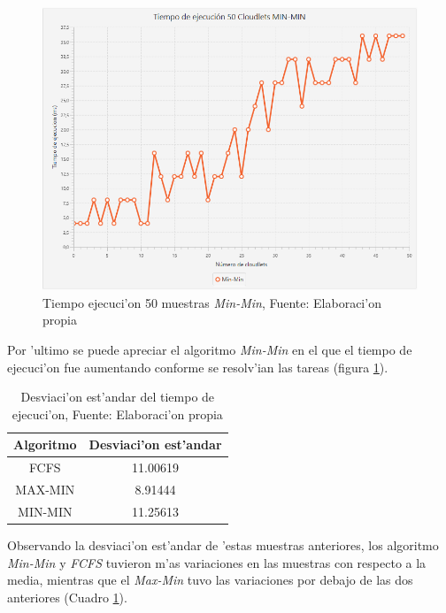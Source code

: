 \newpage
\renewcommand\thefigure{\arabic{figure}}
\begin{figure}[h!] 
	\centering
	\includegraphics[scale=0.5]{media/min-min}
	\caption{Tiempo ejecuci'on 50 muestras \textit{Min-Min}, Fuente: Elaboraci'on propia}
	\label{fig:minmin}
\end{figure}


Por 'ultimo se puede apreciar el algoritmo \textit{Min-Min} en el que el tiempo de ejecuci'on fue aumentando conforme se resolv'ian las tareas (figura \ref{fig:minmin}).


\setcounter{table}{4}
\renewcommand\thetable{\arabic{table}}
\begin{table}[h!]
	\centering
	\begin{tabular}{@{}cc@{}}
		\toprule
		{\bf Algoritmo} & \multicolumn{1}{l}{{\bf Desviaci'on est'andar}} \\ \midrule
		FCFS & 11.00619 \\
		MAX-MIN & 8.91444 \\
		MIN-MIN & 11.25613 \\ \bottomrule
	\end{tabular}
	\caption{Desviaci'on est'andar del tiempo de ejecuci'on, Fuente: Elaboraci'on propia}
	\label{tiempotabla}
\end{table}

Observando la desviaci'on est'andar de 'estas muestras anteriores, los algoritmo \textit{Min-Min} y \textit{FCFS} tuvieron m'as variaciones en las muestras con respecto a la media, mientras que el \textit{Max-Min} tuvo las variaciones por debajo de las dos anteriores (Cuadro \ref{tiempotabla}).
